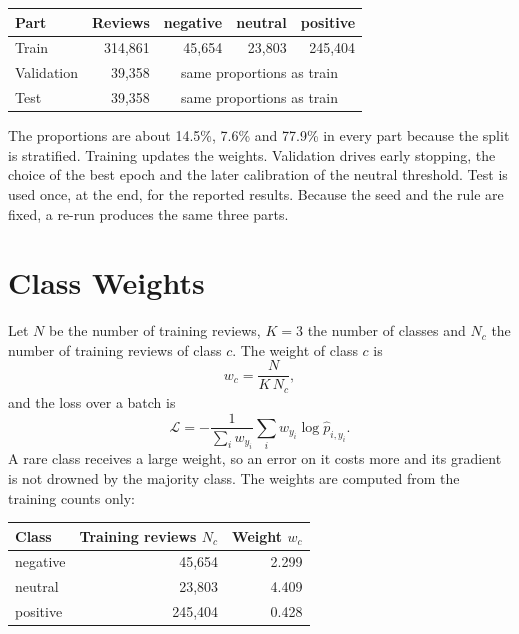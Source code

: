 \begin{center}
\begin{tabular}{@{}lrrrr@{}}
    \toprule
    Part & Reviews & negative & neutral & positive \\
    \midrule
    Train & 314{,}861 & 45{,}654 & 23{,}803 & 245{,}404 \\
    Validation & 39{,}358 & \multicolumn{3}{c}{same proportions as train} \\
    Test & 39{,}358 & \multicolumn{3}{c}{same proportions as train} \\
    \bottomrule
\end{tabular}
\end{center}

The proportions are about 14.5\%, 7.6\% and 77.9\% in every part because the split is stratified. Training updates the weights. Validation drives early stopping, the choice of the best epoch and the later calibration of the neutral threshold. Test is used once, at the end, for the reported results. Because the seed and the rule are fixed, a re-run produces the same three parts.

\section{Class Weights}
\label{sec:5-7}

Let $N$ be the number of training reviews, $K=3$ the number of classes and $N_c$ the number of training reviews of class $c$. The weight of class $c$ is
\begin{equation*}
    w_c = \frac{N}{K\,N_c},
\end{equation*}
and the loss over a batch is
\begin{equation*}
    \mathcal{L} = -\frac{1}{\sum_i w_{y_i}} \sum_i w_{y_i}\log \hat p_{i,y_i}.
\end{equation*}
A rare class receives a large weight, so an error on it costs more and its gradient is not drowned by the majority class. The weights are computed from the training counts only:

\begin{center}
\begin{tabular}{@{}lrr@{}}
    \toprule
    Class & Training reviews $N_c$ & Weight $w_c$ \\
    \midrule
    negative & 45{,}654 & 2.299 \\
    neutral & 23{,}803 & 4.409 \\
    positive & 245{,}404 & 0.428 \\
    \bottomrule
\end{tabular}
\end{center}

